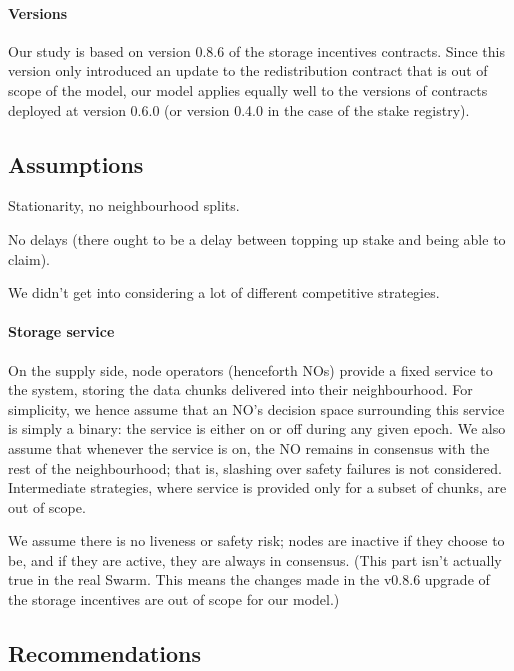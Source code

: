 \paragraph{Versions}
Our study is based on version 0.8.6 of the storage incentives contracts.
%
Since this version only introduced an update to the redistribution contract that is out of scope of the model, our model applies equally well to the versions of contracts deployed at version 0.6.0 (or version 0.4.0 in the case of the stake registry).

\subsection{Assumptions}
Stationarity, no neighbourhood splits. 

No delays (there ought to be a delay between topping up stake and being able to claim).

We didn't get into considering a lot of different competitive strategies.

\paragraph{Storage service}

On the supply side, node operators (henceforth NOs) provide a fixed service to the system, storing the data chunks delivered into their neighbourhood.
%
For simplicity, we hence assume that an NO's decision space surrounding this service is simply a binary: the service is either on or off during any given epoch.
%
We also assume that whenever the service is on, the NO remains in consensus with the rest of the neighbourhood; that is, slashing over safety failures is not considered.
%
Intermediate strategies, where service is provided only for a subset of chunks, are out of scope.

We assume there is no liveness or safety risk; nodes are inactive if they choose to be, and if they are active, they are always in consensus. (This part isn't actually true in the real Swarm. This means the changes made in the v0.8.6 upgrade of the storage incentives are out of scope for our model.)

\subsection{Recommendations}

